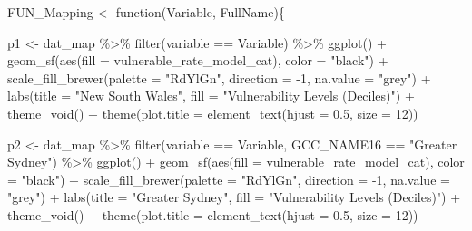 \documentclass[
  letterpaper,
  DIV=11,
  numbers=noendperiod]{scrartcl}
\newenvironment{Shaded}{\begin{snugshade}}{\end{snugshade}}
\newcommand{\AttributeTok}[1]{\textcolor[rgb]{0.40,0.45,0.13}{#1}}
\newcommand{\ControlFlowTok}[1]{\textcolor[rgb]{0.00,0.23,0.31}{#1}}
\newcommand{\DecValTok}[1]{\textcolor[rgb]{0.68,0.00,0.00}{#1}}
\newcommand{\FloatTok}[1]{\textcolor[rgb]{0.68,0.00,0.00}{#1}}
\newcommand{\FunctionTok}[1]{\textcolor[rgb]{0.28,0.35,0.67}{#1}}
\newcommand{\NormalTok}[1]{\textcolor[rgb]{0.00,0.23,0.31}{#1}}
\newcommand{\OtherTok}[1]{\textcolor[rgb]{0.00,0.23,0.31}{#1}}
\newcommand{\SpecialCharTok}[1]{\textcolor[rgb]{0.37,0.37,0.37}{#1}}
\newcommand{\StringTok}[1]{\textcolor[rgb]{0.13,0.47,0.30}{#1}}
\begin{document}
\begin{Shaded}
\begin{Highlighting}[]
\NormalTok{FUN\_Mapping }\OtherTok{\textless{}{-}} \ControlFlowTok{function}\NormalTok{(Variable, FullName)\{}
  
\NormalTok{  p1 }\OtherTok{\textless{}{-}}\NormalTok{ dat\_map }\SpecialCharTok{\%\textgreater{}\%}
    \FunctionTok{filter}\NormalTok{(variable }\SpecialCharTok{==}\NormalTok{ Variable) }\SpecialCharTok{\%\textgreater{}\%}
    \FunctionTok{ggplot}\NormalTok{() }\SpecialCharTok{+}
    \FunctionTok{geom\_sf}\NormalTok{(}\FunctionTok{aes}\NormalTok{(}\AttributeTok{fill =}\NormalTok{ vulnerable\_rate\_model\_cat),}
            \AttributeTok{color =} \StringTok{"black"}\NormalTok{) }\SpecialCharTok{+}
    \FunctionTok{scale\_fill\_brewer}\NormalTok{(}\AttributeTok{palette =} \StringTok{"RdYlGn"}\NormalTok{,}
                      \AttributeTok{direction =} \SpecialCharTok{{-}}\DecValTok{1}\NormalTok{,}
                      \AttributeTok{na.value =} \StringTok{"grey"}\NormalTok{) }\SpecialCharTok{+} 
    \FunctionTok{labs}\NormalTok{(}\AttributeTok{title =} \StringTok{"New South Wales"}\NormalTok{,}
         \AttributeTok{fill =} \StringTok{"Vulnerability Levels (Deciles)"}\NormalTok{) }\SpecialCharTok{+}
    \FunctionTok{theme\_void}\NormalTok{() }\SpecialCharTok{+}
    \FunctionTok{theme}\NormalTok{(}\AttributeTok{plot.title =} \FunctionTok{element\_text}\NormalTok{(}\AttributeTok{hjust =} \FloatTok{0.5}\NormalTok{,}
                                    \AttributeTok{size =} \DecValTok{12}\NormalTok{))}
  
\NormalTok{  p2 }\OtherTok{\textless{}{-}}\NormalTok{ dat\_map }\SpecialCharTok{\%\textgreater{}\%}
    \FunctionTok{filter}\NormalTok{(variable }\SpecialCharTok{==}\NormalTok{ Variable,}
\NormalTok{           GCC\_NAME16 }\SpecialCharTok{==} \StringTok{"Greater Sydney"}\NormalTok{) }\SpecialCharTok{\%\textgreater{}\%}
    \FunctionTok{ggplot}\NormalTok{() }\SpecialCharTok{+}
    \FunctionTok{geom\_sf}\NormalTok{(}\FunctionTok{aes}\NormalTok{(}\AttributeTok{fill =}\NormalTok{ vulnerable\_rate\_model\_cat),}
            \AttributeTok{color =} \StringTok{"black"}\NormalTok{) }\SpecialCharTok{+}
    \FunctionTok{scale\_fill\_brewer}\NormalTok{(}\AttributeTok{palette =} \StringTok{"RdYlGn"}\NormalTok{,}
                      \AttributeTok{direction =} \SpecialCharTok{{-}}\DecValTok{1}\NormalTok{,}
                      \AttributeTok{na.value =} \StringTok{"grey"}\NormalTok{) }\SpecialCharTok{+} 
    \FunctionTok{labs}\NormalTok{(}\AttributeTok{title =} \StringTok{"Greater Sydney"}\NormalTok{,}
         \AttributeTok{fill =} \StringTok{"Vulnerability Levels (Deciles)"}\NormalTok{) }\SpecialCharTok{+}
    \FunctionTok{theme\_void}\NormalTok{() }\SpecialCharTok{+}
    \FunctionTok{theme}\NormalTok{(}\AttributeTok{plot.title =} \FunctionTok{element\_text}\NormalTok{(}\AttributeTok{hjust =} \FloatTok{0.5}\NormalTok{,}
                                    \AttributeTok{size =} \DecValTok{12}\NormalTok{))}
  

\end{Highlighting}
\end{Shaded}
\end{document}
